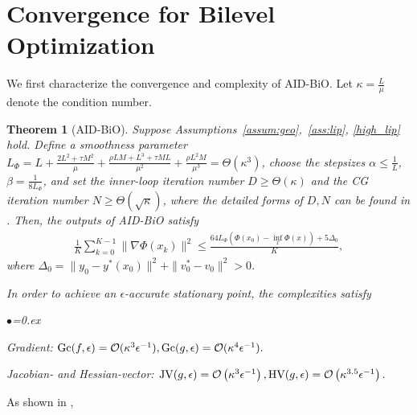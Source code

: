 \documentclass{osudissert96}
\newtheorem{theorem}{Theorem}
\begin{document}
\section{Convergence for Bilevel Optimization}\label{main:result_deter}
We first characterize the convergence and complexity of AID-BiO.  Let $\kappa=\frac{L}{\mu}$ denote the condition number. 
\begin{theorem}[AID-BiO]\label{th:aidthem}
Suppose Assumptions~\ref{assum:geo},~\ref{ass:lip}, \ref{high_lip} hold. Define  a smoothness parameter $L_\Phi = L + \frac{2L^2+\tau M^2}{\mu} + \frac{\rho L M+L^3+\tau M L}{\mu^2} + \frac{\rho L^2 M}{\mu^3}=\Theta(\kappa^3)$, choose the stepsizes $\alpha\leq \frac{1}{L}$, $\beta=\frac{1}{8L_\Phi}$, and set the inner-loop iteration number $D\geq\Theta(\kappa)$ and the CG iteration number  $N\geq \Theta(\sqrt{\kappa})$, where the detailed forms of  $D,N$ can be found in . 
 Then, the outputs of AID-BiO satisfy
\begin{align*}
\frac{1}{K}\sum_{k=0}^{K-1}\| \nabla \Phi(x_k)\|^2 \leq \frac{64L_\Phi (\Phi(x_0) - \inf_x\Phi(x))+5\Delta_0}{K}, 
\end{align*}
where $\Delta_0=\|y_0-y^*(x_{0})\|^2 + \|v_{0}^*-v_0\|^2>0$.

In order to achieve an $\epsilon$-accurate stationary point, the complexities satisfy 
\begin{list}{$\bullet$}{\topsep=0.ex \leftmargin=0.2in  \itemsep =0.01in}
\item Gradient: {\small$\mbox{\normalfont Gc}(f,\epsilon)=\mathcal{O}(\kappa^3\epsilon^{-1}), \mbox{\normalfont Gc}(g,\epsilon)=\mathcal{O}(\kappa^4\epsilon^{-1}).$}
\item Jacobian- and Hessian-vector: {\small$ \mbox{\normalfont JV}(g,\epsilon)=\mathcal{O}\left(\kappa^3\epsilon^{-1}\right), \mbox{\normalfont HV}(g,\epsilon)=\mathcal{O}\left(\kappa^{3.5}\epsilon^{-1}\right).$}
\end{list}
\end{theorem}
As shown in , 
\end{document}
